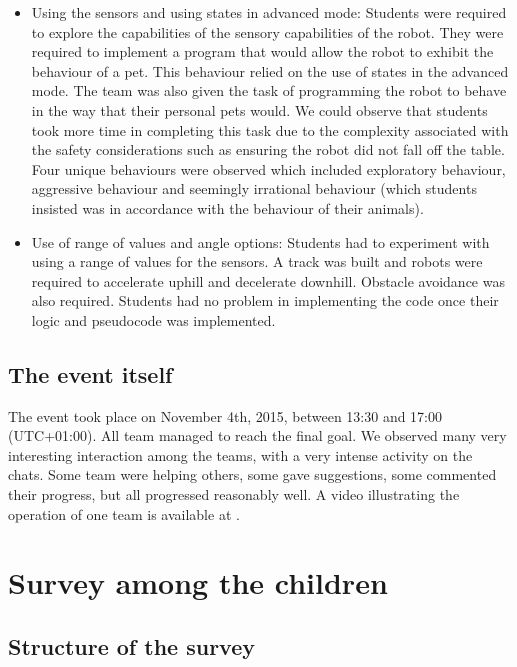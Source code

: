 \documentclass{intech-journal}
\begin{document}
\begin{itemize}
\item Using the sensors and using states in advanced mode: Students were required to explore the capabilities of the sensory capabilities of the robot. 
They were required to implement a program that would allow the robot to exhibit the behaviour of a pet. 
This behaviour relied on the use of states in the advanced mode. 
The team was also given the task of programming the robot to behave in the way that their personal pets would.  We could observe that students took more time in completing this task due to the complexity associated with the safety considerations such as ensuring the robot did not fall off the table. 
Four unique behaviours were observed which included exploratory behaviour, aggressive behaviour and seemingly irrational behaviour (which students insisted was in accordance with the behaviour of their animals).
\item Use of range of values and angle options: Students had to experiment with using a range of values for the sensors.
A track was built and robots were required to accelerate uphill and decelerate downhill. 
Obstacle avoidance was also required.
Students had no problem in implementing the code once their logic and pseudocode was implemented.
\end{itemize}

\subsection{The event itself}

The event took place on November 4th, 2015, between 13:30 and 17:00 (UTC+01:00).
All team managed to reach the final goal.
We observed many very interesting interaction among the teams, with a very intense activity on the chats.
Some team were helping others, some gave suggestions, some commented their progress, but all progressed reasonably well.
A video illustrating the operation of one team is available at \cite{SwissinfoR2T2}.

\section{Survey among the children}

\subsection{Structure of the survey}
\end{document}
